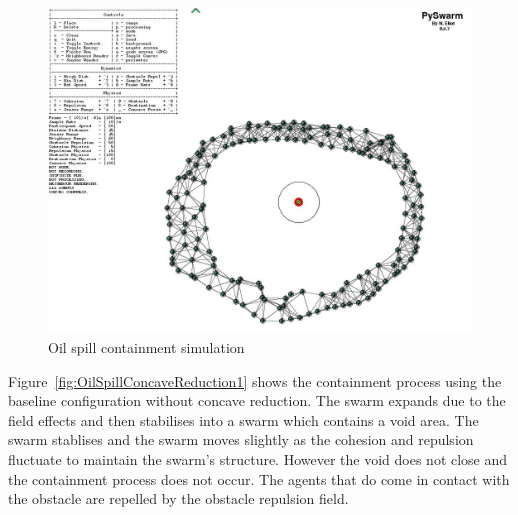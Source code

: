 \begin{figure}[H]
\begin{center}
\includegraphics[width=14cm]{CHAPTER-7/figures/OilSpillSimulator}
\end{center}
\caption{Oil spill containment simulation\label{concave:OilSpillSimulation}}
\end{figure}

Figure~\ref{fig:OilSpillConcaveReduction1} shows the containment process using the baseline configuration without concave reduction. The swarm expands due to the field effects and then stabilises into a swarm which contains a void area. The swarm stablises and the swarm moves slightly as the cohesion and repulsion fluctuate to maintain the swarm's structure. However the void does not close and the containment process does not occur. The agents that do come in contact with the obstacle are repelled by the obstacle repulsion field.

